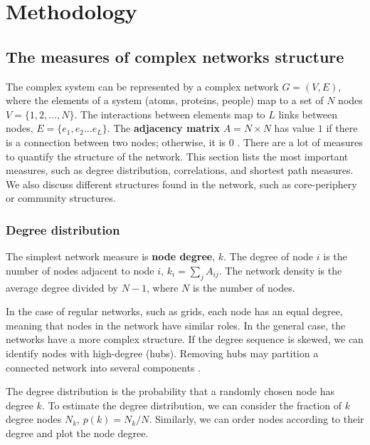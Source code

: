 \chapter{Methodology} %
\label{Ch:Method}

\section{The measures of complex networks structure}

The complex system can be represented by a complex network $G=(V, E)$, where the elements of a system (atoms, proteins, people) map to a set of $N$ nodes $V=\{1, 2, ..., N\}$. The interactions between elements map to $L$ links between nodes, $E = \{ e_1, e_2... e_L\}$. The \textbf{adjacency matrix} ${A} = N \times N$ has value $1$ if there is a connection between two nodes; otherwise, it is $0$ \cite{boccaletti2006complex}.
There are a lot of measures to quantify the structure of the network. This section lists the most important measures, such as degree distribution, correlations, and shortest path measures. We also discuss different structures found in the network, such as core-periphery or community structures.  

\subsection{Degree distribution}

The simplest network measure is \textbf{node degree}, $k$. The degree of node $i$ is %
the number of nodes adjacent %
 to node $i$, $k_i = \sum_j A_{ij}$. The network density is the average degree divided by $N-1$, where $N$ is the number of nodes. %
 
In the case of regular networks, such as grids, each node has an equal degree, meaning that nodes in the network have similar roles. In the general case, the networks have a more complex structure. If the degree sequence is skewed, we can identify nodes with high-degree (hubs). Removing hubs may partition a connected network into several components \cite{albert2000error}. %
 
The degree distribution is the probability that a randomly chosen node has degree $k$. To estimate the degree distribution, we can consider the fraction of $k$ degree nodes $N_k$, $p(k) = N_k/N$. Similarly, we can order nodes according to their degree and plot the node degree.

